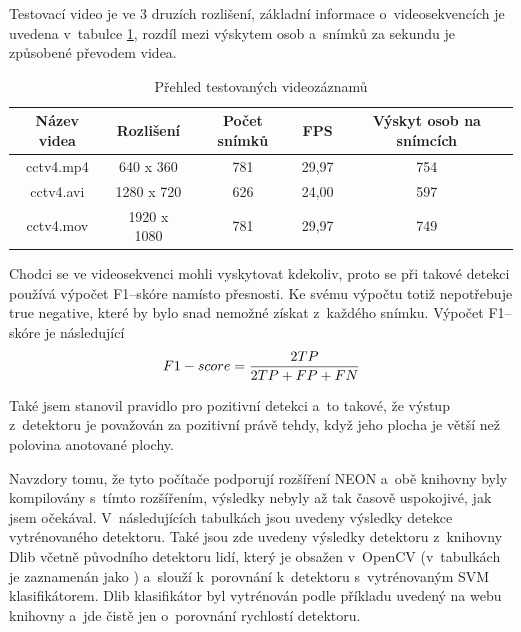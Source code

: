 Testovací video je ve 3 druzích rozlišení, základní informace o~videosekvencích je uvedena v~tabulce \ref{videosTab}, rozdíl mezi výskytem osob a~snímků za sekundu je způsobené převodem videa.

\begin{table}[H]
\centering
\caption{Přehled testovaných videozáznamů}
\begin{tabular} { |c|c|c|c|c| }
\hline
{Název videa}   & {Rozlišení} 	&   {Počet snímků}  & {FPS} & {Výskyt osob na snímcích} \\ \hline
cctv4.mp4 	 &  640 x  360	     &      781		& 29,97 & 	      754			 \\ \hline
cctv4.avi		 & 1280 x  720	     &      626		& 24,00 & 	      597			 \\ \hline
cctv4.mov 	 & 1920 x 1080	     &      781		& 29,97 & 	      749			 \\ \hline
\end{tabular}
\label{videosTab}
\end{table}

Chodci se ve videosekvenci mohli vyskytovat kdekoliv, proto se při takové detekci používá výpočet F1--skóre namísto přesnosti. Ke svému výpočtu totiž nepotřebuje true negative, které by bylo snad nemožné získat z~každého snímku. Výpočet F1--skóre je následující
\begin{equation*}
\centering
 \label{eq:f1score}
 \begin{aligned}
F1-score = \frac{ 2TP}{2TP + FP + FN}
 \end{aligned}
\end{equation*}

Také jsem stanovil pravidlo pro pozitivní detekci a~to takové, že výstup z~detektoru je považován za pozitivní právě tehdy, když jeho plocha je větší než polovina anotované plochy. 

Navzdory tomu, že tyto počítače podporují rozšíření NEON a~obě knihovny byly kompilovány s~tímto rozšířením, výsledky nebyly až tak časově uspokojivé, jak jsem očekával. V~následujících tabulkách jsou uvedeny výsledky detekce vytrénovaného detektoru. Také jsou zde uvedeny výsledky detektoru z~knihovny Dlib včetně původního detektoru lidí, který je obsažen v~OpenCV (v~tabulkách je zaznamenán jako ) a~slouží k~porovnání k~detektoru s~vytrénovaným SVM klasifikátorem. Dlib klasifikátor byl vytrénován podle příkladu uvedený na webu knihovny a~jde čistě jen o~porovnání rychlostí detektoru. 


